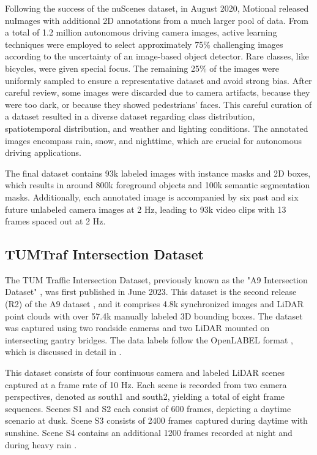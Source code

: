 Following the success of the nuScenes \cite{nuscenes} dataset, in August 2020, Motional released nuImages \cite{nuImages} with additional 2D annotations from a much larger pool of data. From a total of 1.2 million autonomous driving camera images, active learning techniques were employed to select approximately 75\% challenging images according to the uncertainty of an image-based object detector. Rare classes, like bicycles, were given special focus. The remaining 25\% of the images were uniformly sampled to ensure a representative dataset and avoid strong bias. After careful review, some images were discarded due to camera artifacts, because they were too dark, or because they showed pedestrians' faces. This careful curation of a dataset resulted in a diverse dataset regarding class distribution, spatiotemporal distribution, and weather and lighting conditions. The annotated images encompass rain, snow, and nighttime, which are crucial for autonomous driving applications. 

The final dataset contains 93k labeled images with instance masks and 2D boxes, which results in around 800k foreground objects and 100k semantic segmentation masks. Additionally, each annotated image is accompanied by six past and six future unlabeled camera images at 2 Hz, leading to 93k video clips with 13 frames spaced out at 2 Hz. 

\subsection{TUMTraf Intersection Dataset} \label{section:TUMTrafIntersectionDataset}

The TUM Traffic Intersection Dataset, previously known as the "A9 Intersection Dataset" \cite{zimmer2023a9}, was first published in June 2023. This dataset is the second release (R2) of the A9 dataset \cite{a9dataset}, and it comprises 4.8k synchronized images and LiDAR point clouds with over 57.4k manually labeled 3D bounding boxes. The dataset was captured using two roadside cameras and two LiDAR mounted on intersecting gantry bridges. The data labels follow the OpenLABEL format \cite{openlabel}, which is discussed in detail in .

This dataset consists of four continuous camera and labeled LiDAR scenes captured at a frame rate of 10 Hz. Each scene is recorded from two camera perspectives, denoted as south1 and south2, yielding a total of eight frame sequences. Scenes S1 and S2 each consist of 600 frames, depicting a daytime scenario at dusk. Scene S3 consists of 2400 frames captured during daytime with sunshine. Scene S4 contains an additional 1200 frames recorded at night and during heavy rain \cite{a9dataset}.

